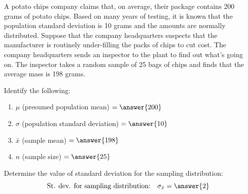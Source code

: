 \documentclass{ximera}
\begin{document}
\begin{problem}\label{pr:chips}
A potato chips company claims that, on average, their package contains 200 grams of potato chips. Based on many years of testing, it is known that the population standard deviation is 10 grams and the amounts are normally distributed. Suppose that the company headquarters suspects that the manufacturer is routinely under-filling the packs of chips to cut cost. The company headquarters sends an inspector to the plant to find out what’s going on. The inspector takes a random sample of 25 bags of chips and finds that the average mass is 198 grams. 

\begin{question} 
Identify the following:
\begin{enumerate}
    \item $\mu$ (presumed population mean) $= \answer{200}$
    \item $\sigma$ (population standard deviation) $= \answer{10}$
    \item $\bar{x}$ (sample mean) $=\answer{198}$
    \item $n$ (sample size) $= \answer{25}$
\end{enumerate}
\end{question}

\begin{question}
Determine the value of standard deviation for the sampling distribution:
$$\mbox{St. dev. for sampling distribution:}\quad\sigma_{\bar{x}}= \answer{2}$$
\end{question}


\end{problem}
\end{document}
